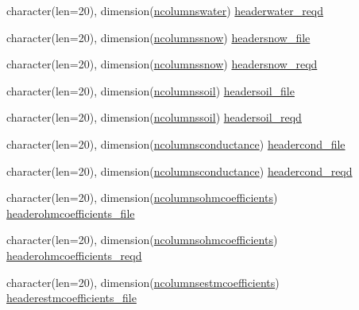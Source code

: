 \begin{DoxyCompactItemize}
\item 
character(len=20), dimension(\hyperlink{namespaceallocatearray_a58f6aaf0837a4d8d3383254237a26732}{ncolumnswater}) \hyperlink{namespaceallocatearray_a20a8727d12f806e513fcdbb3ebdc1482}{headerwater\+\_\+reqd}
\item 
character(len=20), dimension(\hyperlink{namespaceallocatearray_af347c941e3c24ef04005876d0d351505}{ncolumnssnow}) \hyperlink{namespaceallocatearray_a3aa165ae073295417f62462fa15676da}{headersnow\+\_\+file}
\item 
character(len=20), dimension(\hyperlink{namespaceallocatearray_af347c941e3c24ef04005876d0d351505}{ncolumnssnow}) \hyperlink{namespaceallocatearray_a582758673cb4b699f9845aa05dc3d3b0}{headersnow\+\_\+reqd}
\item 
character(len=20), dimension(\hyperlink{namespaceallocatearray_a0e0e9877b1623ca21932a4793c7b8641}{ncolumnssoil}) \hyperlink{namespaceallocatearray_a9031fbce0a0f6d10e36ea7ff3ae3f49b}{headersoil\+\_\+file}
\item 
character(len=20), dimension(\hyperlink{namespaceallocatearray_a0e0e9877b1623ca21932a4793c7b8641}{ncolumnssoil}) \hyperlink{namespaceallocatearray_ae457c859ad17442ce09399707fecd342}{headersoil\+\_\+reqd}
\item 
character(len=20), dimension(\hyperlink{namespaceallocatearray_a2830c674e41c46900c1088c40baef680}{ncolumnsconductance}) \hyperlink{namespaceallocatearray_adabcfce2cc166c20164de6589b4402f1}{headercond\+\_\+file}
\item 
character(len=20), dimension(\hyperlink{namespaceallocatearray_a2830c674e41c46900c1088c40baef680}{ncolumnsconductance}) \hyperlink{namespaceallocatearray_ab87870fe28357b94254d1d6c35e06290}{headercond\+\_\+reqd}
\item 
character(len=20), dimension(\hyperlink{namespaceallocatearray_a290704d8211d9850cffa53e494c6821e}{ncolumnsohmcoefficients}) \hyperlink{namespaceallocatearray_ab57027814b6b042a4069c3a133738d76}{headerohmcoefficients\+\_\+file}
\item 
character(len=20), dimension(\hyperlink{namespaceallocatearray_a290704d8211d9850cffa53e494c6821e}{ncolumnsohmcoefficients}) \hyperlink{namespaceallocatearray_a7a6f653f2a1b5e347b03dd6b859f1ff5}{headerohmcoefficients\+\_\+reqd}
\item 
character(len=20), dimension(\hyperlink{namespaceallocatearray_ab6963e51ec24ecb58c1ee21fd8a70654}{ncolumnsestmcoefficients}) \hyperlink{namespaceallocatearray_ae482241585a630ce1c579f7016feaa72}{headerestmcoefficients\+\_\+file}
\item 

\end{DoxyCompactItemize}
